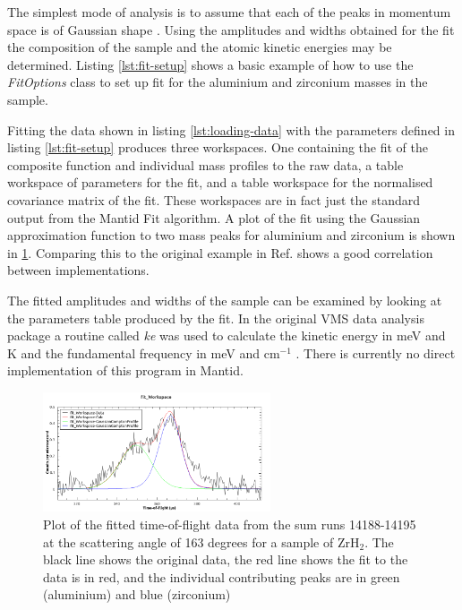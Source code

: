 \documentclass[paper=a4, fontsize=11pt]{scrartcl}	%
\numberwithin{equation}{section}															%
\numberwithin{figure}{section}																%
\numberwithin{table}{section}
\begin{document}
The simplest mode of analysis is to assume that each of the peaks in momentum space is of Gaussian shape \cite{mayers2011calibration}. Using the amplitudes and widths obtained for the fit the composition of the sample and the atomic kinetic energies may be determined. Listing \ref{lst:fit-setup} shows a basic example of how to use the \textit{FitOptions} class to set up fit for the aluminium and zirconium masses in the sample.

Fitting the data shown in listing \ref{lst:loading-data} with the parameters defined in listing \ref{lst:fit-setup} produces three workspaces. One containing the fit of the composite function and individual mass profiles to the raw data, a table workspace of parameters for the fit, and a table workspace for the normalised covariance matrix of the fit. These workspaces are in fact just the standard output from the Mantid Fit algorithm. A plot of the fit using the Gaussian approximation function to two mass peaks for aluminium and zirconium is shown in \ref{fig:gaussian-example-fit}. Comparing this to the original example in Ref. \cite{mayers2010user} shows a good correlation between implementations.

The fitted amplitudes and widths of the sample can be examined by looking at the parameters table produced by the fit. In the original VMS data analysis package a routine called \textit{ke} was used to calculate the kinetic energy in meV and K and the fundamental frequency in meV and cm$^{-1}$ \cite{mayers2010user}. There is currently no direct implementation of this program in Mantid.

\begin{figure}[H]
\centering
\includegraphics[width=0.6\textwidth]{img/gaussian-fit-example.png}
\caption{Plot of the fitted time-of-flight data from the sum runs 14188-14195 at the scattering angle of 163 degrees for a sample of ZrH$_2$. The black line shows the original data, the red line shows the fit to the data is in red, and the individual contributing peaks are in green (aluminium) and blue (zirconium)}
\label{fig:gaussian-example-fit}
\end{figure}
\end{document}
